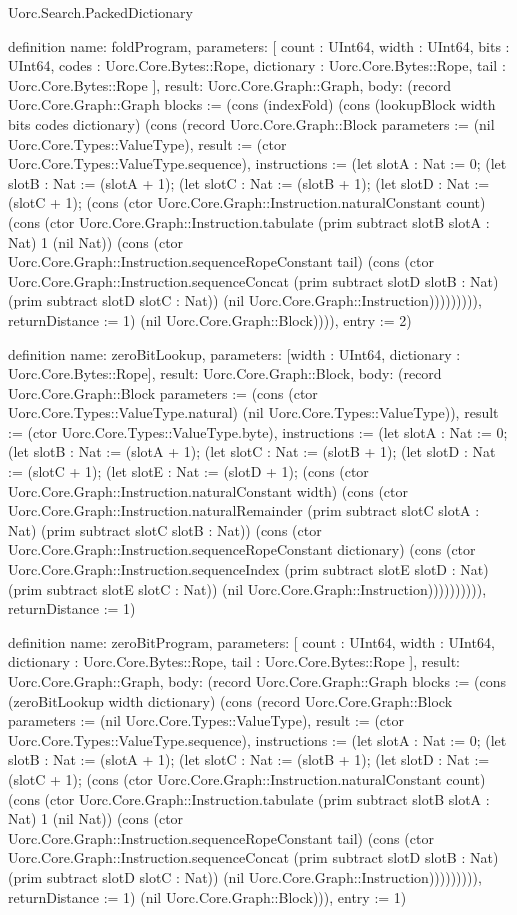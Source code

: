 \begin{lexlean}{Uorc.Search.PackedDictionary}
\begin{semanticmodule}
definition{
  name: foldProgram,
  parameters: [
    count : UInt64,
    width : UInt64,
    bits : UInt64,
    codes : Uorc.Core.Bytes::Rope,
    dictionary : Uorc.Core.Bytes::Rope,
    tail : Uorc.Core.Bytes::Rope
  ],
  result: Uorc.Core.Graph::Graph,
  body: (record Uorc.Core.Graph::Graph {blocks := (cons (indexFold) (cons (lookupBlock width bits codes dictionary) (cons (record Uorc.Core.Graph::Block {parameters := (nil Uorc.Core.Types::ValueType), result := (ctor Uorc.Core.Types::ValueType.sequence), instructions := (let slotA : Nat := 0; (let slotB : Nat := (slotA + 1); (let slotC : Nat := (slotB + 1); (let slotD : Nat := (slotC + 1); (cons (ctor Uorc.Core.Graph::Instruction.naturalConstant count) (cons (ctor Uorc.Core.Graph::Instruction.tabulate (prim subtract slotB slotA : Nat) 1 (nil Nat)) (cons (ctor Uorc.Core.Graph::Instruction.sequenceRopeConstant tail) (cons (ctor Uorc.Core.Graph::Instruction.sequenceConcat (prim subtract slotD slotB : Nat) (prim subtract slotD slotC : Nat)) (nil Uorc.Core.Graph::Instruction))))))))), returnDistance := 1}) (nil Uorc.Core.Graph::Block)))), entry := 2})
}

definition{
  name: zeroBitLookup,
  parameters: [width : UInt64, dictionary : Uorc.Core.Bytes::Rope],
  result: Uorc.Core.Graph::Block,
  body: (record Uorc.Core.Graph::Block {parameters := (cons (ctor Uorc.Core.Types::ValueType.natural) (nil Uorc.Core.Types::ValueType)), result := (ctor Uorc.Core.Types::ValueType.byte), instructions := (let slotA : Nat := 0; (let slotB : Nat := (slotA + 1); (let slotC : Nat := (slotB + 1); (let slotD : Nat := (slotC + 1); (let slotE : Nat := (slotD + 1); (cons (ctor Uorc.Core.Graph::Instruction.naturalConstant width) (cons (ctor Uorc.Core.Graph::Instruction.naturalRemainder (prim subtract slotC slotA : Nat) (prim subtract slotC slotB : Nat)) (cons (ctor Uorc.Core.Graph::Instruction.sequenceRopeConstant dictionary) (cons (ctor Uorc.Core.Graph::Instruction.sequenceIndex (prim subtract slotE slotD : Nat) (prim subtract slotE slotC : Nat)) (nil Uorc.Core.Graph::Instruction)))))))))), returnDistance := 1})
}

definition{
  name: zeroBitProgram,
  parameters: [
    count : UInt64,
    width : UInt64,
    dictionary : Uorc.Core.Bytes::Rope,
    tail : Uorc.Core.Bytes::Rope
  ],
  result: Uorc.Core.Graph::Graph,
  body: (record Uorc.Core.Graph::Graph {blocks := (cons (zeroBitLookup width dictionary) (cons (record Uorc.Core.Graph::Block {parameters := (nil Uorc.Core.Types::ValueType), result := (ctor Uorc.Core.Types::ValueType.sequence), instructions := (let slotA : Nat := 0; (let slotB : Nat := (slotA + 1); (let slotC : Nat := (slotB + 1); (let slotD : Nat := (slotC + 1); (cons (ctor Uorc.Core.Graph::Instruction.naturalConstant count) (cons (ctor Uorc.Core.Graph::Instruction.tabulate (prim subtract slotB slotA : Nat) 1 (nil Nat)) (cons (ctor Uorc.Core.Graph::Instruction.sequenceRopeConstant tail) (cons (ctor Uorc.Core.Graph::Instruction.sequenceConcat (prim subtract slotD slotB : Nat) (prim subtract slotD slotC : Nat)) (nil Uorc.Core.Graph::Instruction))))))))), returnDistance := 1}) (nil Uorc.Core.Graph::Block))), entry := 1})
}


\end{semanticmodule}
\end{lexlean}
